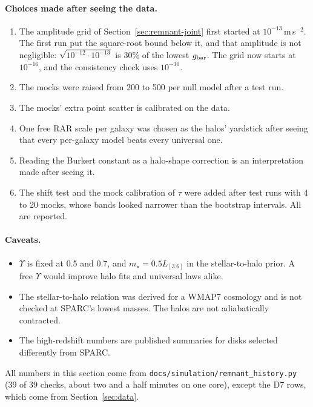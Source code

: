 \paragraph{Choices made after seeing the data.}
\begin{enumerate}[nosep]
\item The amplitude grid of Section~\ref{sec:remnant-joint} first started at $10^{-13}$\,m\,s$^{-2}$. The first run put the square-root bound
below it, and that amplitude is not negligible: $\sqrt{10^{-12}\cdot10^{-13}}$ is 30\% of the lowest $g_{\rm bar}$. The grid now starts at
$10^{-16}$, and the consistency check uses $10^{-30}$.
\item The mocks were raised from 200 to 500 per null model after a test run.
\item The mocks' extra point scatter is calibrated on the data.
\item One free RAR scale per galaxy was chosen as the halos' yardstick after seeing that every per-galaxy model beats every universal one.
\item Reading the Burkert constant as a halo-shape correction is an interpretation made after seeing it.
\item The shift test and the mock calibration of $\tau$ were added after test runs with 4 to 20 mocks, whose bands looked narrower than the
bootstrap intervals. All are reported.
\end{enumerate}

\paragraph{Caveats.}
\begin{itemize}[nosep]
\item $\Upsilon$ is fixed at 0.5 and 0.7, and $m_\star=0.5L_{[3.6]}$ in the stellar-to-halo prior. A free $\Upsilon$ would improve halo fits and
universal laws alike.
\item The stellar-to-halo relation was derived for a WMAP7 cosmology and is not checked at SPARC's lowest masses. The halos are not
adiabatically contracted.
\item The high-redshift numbers are published summaries for disks selected differently from SPARC.
\end{itemize}

All numbers in this section come from \texttt{docs/simulation/remnant\_history.py} (39 of 39 checks, about two and a half minutes on one
core), except the D7 rows, which come from Section~\ref{sec:data}.

